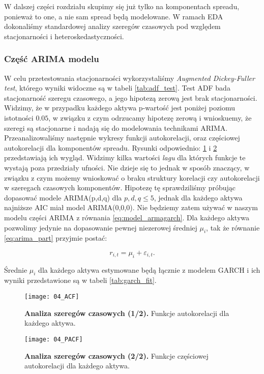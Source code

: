 W dalszej części rozdziału skupimy się już tylko na komponentach spreadu, ponieważ to one, a nie sam spread będą modelowane. W ramach EDA dokonaliśmy standardowej analizy szeregów czasowych pod względem stacjonarności i heteroskedastyczności. 

\subsubsection{Część ARIMA modelu}
W celu przetestowania stacjonarności wykorzystaliśmy \emph{Augmented Dickey-Fuller test}, którego wyniki widoczne są w tabeli \ref{tab:adf_test}. Test ADF bada stacjonarność szeregu czasowego, a jego hipotezą zerową jest brak stacjonarności. Widzimy, że w przypadku każdego aktywa p-wartość jest poniżej poziomu istotności $0.05$, w związku z czym odrzucamy hipotezę zerową i wnioskuemy, że szeregi są stacjonarne i nadają się do modelowania technikami ARIMA.\\
Przeanalizowaliśmy następnie wykresy funkcji autokorelacji, oraz częściowej autokorelacji dla komponentów spreadu. Rysunki odpowiednio: \ref{fig:acf} i \ref{fig:pacf} przedstawiają ich wygląd. Widzimy kilka wartości \emph{lagu} dla których funkcje te wystają poza przedziały ufności. Nie dzieje się to jednak w sposób znaczący, w związku z czym możemy wnioskować o braku struktury korelacji czy autokorelacji w szeregach czasowych komponentów. Hipotezę tę sprawdziliśmy próbując dopasować modele ARIMA(p,d,q) dla $p,d,q \leqslant 5$, jednak dla każdego aktywa najniższe AIC miał model ARIMA(0,0,0). Nie będziemy zatem używać w naszym modelu części ARIMA z równania \ref{eq:model_armagarch}. Dla każdego aktywa pozwolimy jedynie na dopasowanie pewnej niezerowej średniej $\mu_i$, tak że równanie \ref{eq:arima_part}
przyjmie postać:

$$ r_{i, t} = \mu_i + \varepsilon_{i, t}.$$

Średnie $\mu_i$ dla każdego aktywa estymowane będą łącznie z modelem GARCH i ich wyniki przedstawione są w tabeli \ref{tab:garch_fit}.

\begin{figure}[h]
	\centering
	\texttt{[image: 04\_ACF]}
	\caption{\textbf{Analiza szeregów czasowych (1/2).} Funkcje autokorelacji dla każdego aktywa. \label{fig:acf}}
\end{figure}

\begin{figure}[h]
	\centering
	\texttt{[image: 04\_PACF]}
	\caption{\textbf{Analiza szeregów czasowych (2/2).} Funkcje częściowej autokorelacji dla każdego aktywa. \label{fig:pacf}}
\end{figure}


